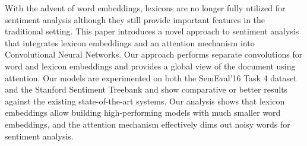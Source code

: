 With the advent of word embeddings, lexicons are no longer fully utilized for sentiment analysis although they still provide important features in the traditional setting. This paper introduces a novel approach to sentiment analysis that integrates lexicon embeddings and an attention mechanism into Convolutional Neural Networks. Our approach performs separate convolutions for word and lexicon embeddings and provides a global view of the document using attention. Our models are experimented on both the SemEval'16 Task 4 dataset and the Stanford Sentiment Treebank and show comparative or better results against the existing state-of-the-art systems. Our analysis shows that lexicon embeddings allow building high-performing models with much smaller word embeddings, and the attention mechanism effectively dims out noisy words for sentiment analysis.

